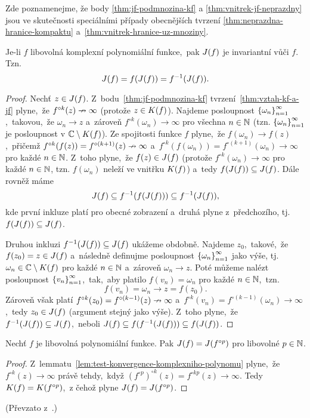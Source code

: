 Zde poznamenejme, že body \ref{thm:jf-podmnozina-kf} a \ref{thm:vnitrek-jf-neprazdny} jsou ve skutečnosti speciálními případy obecnějších tvrzení \ref{thm:neprazdna-hranice-kompaktu} a~\ref{thm:vnitrek-hranice-uz-mnoziny}.
\begin{theorem}\label{invariance-jf}
    Je-li $f$ libovolná komplexní polynomiální funkce,~pak $J(f)$ je invariantní vůči $f$. Tzn.
    \[J(f)=f(J(f))=f^{-1}(J(f)).\]
\end{theorem}
\begin{proof}
    Nechť $z\in J(f)$. Z~bodu~\ref{thm:jf-podmnozina-kf} tvrzení~\ref{thm:vztah-kf-a-jf} plyne,~že $f^{\circ k}(z)\nrightarrow\infty$ (protože $z\in K(f)$). Najdeme posloupnost $\left\{\omega_n\right\}_{n=1}^\infty$,~takovou,~že $\omega_n\to z$ a~zároveň $f^{\circ k}(\omega_n)\to\infty$ pro všechna $n\in\mathbb{N}$ (tzn. $\left\{\omega_n\right\}_{n=1}^\infty$ je posloupnost v $\mathbb{C}\setminus K(f)$). Ze spojitosti funkce $f$ plyne,~že $f(\omega_n)\to f(z)$,~přičemž $f^{\circ k}(f(z))=f^{\circ(k+1)}(z)\nrightarrow\infty$ a~$f^{\circ k}(f(\omega_n))=f^{\circ(k+1)}(\omega_n)\to\infty$ pro každé $n\in\mathbb{N}$. Z~toho plyne,~že $f(z)\in J(f)$ (protože $f^{\circ k}(\omega_n)\to\infty$ pro každé $n\in\mathbb{N}$, tzn. $f(\omega_n)$ neleží ve vnitřku $K(f)$) a~tedy $f(J(f))\subseteq J(f)$. Dále rovněž máme
    \[J(f)\subseteq f^{-1}(f(J(f)))\subseteq f^{-1}(J(f)),\]
    kde první inkluze platí pro obecné zobrazení a~druhá plyne z~předchozího, tj. $f(J(f))\subseteq J(f)$.

    Druhou inkluzi $f^{-1}(J(f))\subseteq J(f)$ ukážeme obdobně. Najdeme $z_0$,~takové,~že $f(z_0)=z\in J(f)$ a~následně definujme posloupnost $\left\{\omega_n\right\}_{n=1}^\infty$ jako výše, tj. $\omega_n\in\mathbb{C}\setminus K(f)$ pro každé $n\in\mathbb{N}$ a~zároveň $\omega_n\to z$. Poté můžeme nalézt posloupnost $\left\{v_n\right\}_{n=1}^\infty$,~tak,~aby platilo $f(v_n)=\omega_n$ pro každé $n\in\mathbb{N}$,~tzn.
    \[f(v_n)=\omega_n\to z=f(z_0).\]
    Zároveň však platí $f^{\circ k}(z_0)=f^{\circ(k-1)}(z)\nrightarrow\infty$ a~$f^{\circ k}(v_n)=f^{\circ(k-1)}(\omega_n)\to\infty$,~tedy $z_0\in J(f)$ (argument stejný jako výše). Z~toho plyne,~že $f^{-1}(J(f))\subseteq J(f)$,~neboli $J(f)\subseteq f(f^{-1}(J(f)))\subseteq f(J(f))$.
\end{proof}
\begin{theorem}\label{ekvivalence-jf-a-jfp}
    Nechť $f$ je libovolná polynomiální funkce. Pak $J(f)=J(f^{\circ p})$ pro libovolné $p\in\mathbb{N}$.
\end{theorem}
\begin{proof}
    Z~lemmatu~\ref{lem:test-konvergence-komplexniho-polynomu} plyne,~že $f^{\circ k}(z)\to\infty$ právě tehdy,~když $(f^{\circ p})^{\circ k}(z)=f^{\circ kp}(z)\to\infty$. Tedy $K(f)=K(f^{\circ p})$,~z čehož plyne $J(f)=J(f^{\circ p})$.
\end{proof}
(Převzato z~\citep[str. 238]{Falconer1989}.)


